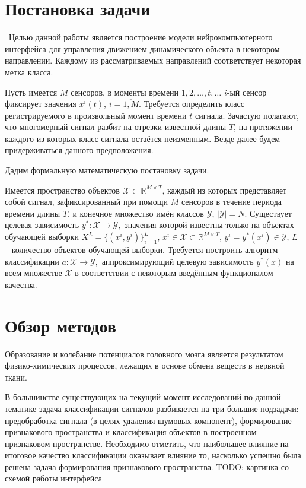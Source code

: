 \documentclass[12pt,fleqn]{article}
\begin{document}
\clearpage 

\section{Постановка задачи}
	\quad\,\,\,Целью данной работы является построение модели нейрокомпьютерного интерфейса для управления движением динамического объекта в некотором направлении. Каждому из рассматриваемых направлений соответствует некоторая метка класса.
 	\par Пусть имеется $M$ сенсоров, в моменты времени $1, 2, \dots, t, \dots$ $i$-ый сенсор фиксирует значения $x^i(t)$, $i = \overline{1,M}.$ Требуется определить класс регистрируемого в произвольный момент времени $t$ сигнала. Зачастую полагают, что многомерный сигнал разбит на отрезки известной длины $T$, на протяжении каждого из которых класс сигнала остаётся неизменным. Везде далее будем придерживаться данного предположения.
	\par Дадим формальную математическую постановку задачи.
	\par Имеется пространство объектов $\mathcal{X} \subset \mathbb{R}^{M \times T}$, каждый из которых представляет собой сигнал, зафиксированный при помощи $M$ сенсоров в течение периода времени длины $T$, и конечное множество имён классов $\mathcal{Y}, \, |\mathcal{Y}| = N$. Существует целевая зависимость $y^*: \mathcal{X} \to \mathcal{Y},$ значения которой известны только на объектах обучающей выборки $X^L = \{ (x^i, y^i)\}_{i=1}^L, \, x^i \in \mathcal{X} \subset \mathbb{R}^{M \times T}, \, y^i = y^*(x^i) \in \mathcal{Y}, \, L$ -- количество объектов обучающей выборки. Требуется построить алгоритм классификации $a: \mathcal{X} \to \mathcal{Y},$ аппроксимирующий целевую зависимость $y^*(x)$ на всем множестве $\mathcal{X}$ в соответствии с некоторым введённым функционалом качества.

\clearpage 

\section{Обзор методов}
	\par Образование и колебание потенциалов головного мозга является результатом физико-химических процессов, лежащих в основе обмена веществ в нервной ткани.
	\par В большинстве существующих на текущий момент исследований по данной тематике задача классификации сигналов разбивается на три большие подзадачи: предобработка сигнала (в целях удаления шумовых компонент), формирование признакового пространства и классификация объектов в построенном признаковом пространстве. Необходимо отметить, что наибольшее влияние на итоговое качество классификации оказывает влияние то, насколько успешно была решена задача формирования признакового пространства. TODO: картинка со схемой работы интерфейса
\end{document}
